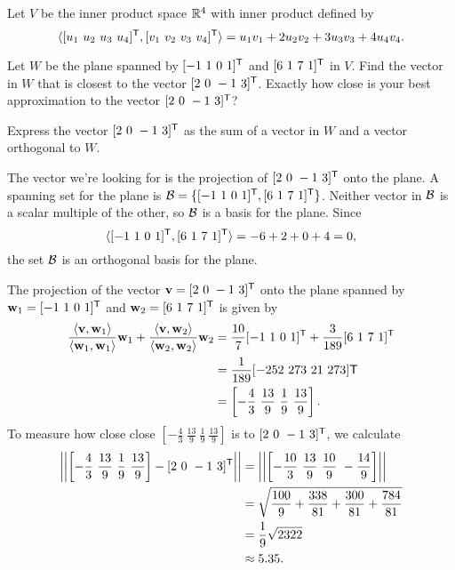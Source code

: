 \begin{example} Let $V$ be the inner product space $\mathbb{R}^4$ with inner product defined by 
\[\langle [u_1 \ u_2 \ u_3 \ u_4]^{\mathsf{T}}, [v_1 \ v_2 \ v_3 \ v_4]^{\mathsf{T}} \rangle = u_1v_1 + 2u_2v_2 + 3u_3v_3 + 4u_4v_4.\]
\ba
\item Let $W$ be the plane spanned by $[-1 \ 1\ 0 \ 1]^{\mathsf{T}}$ and $[6 \ 1 \ 7 \ 1]^{\mathsf{T}}$ in $V$. Find the vector in $W$ that is closest to the vector $[2 \ 0 \ -1 \ 3]^{\mathsf{T}}$. Exactly how close is your best approximation to the vector $[2 \ 0 \ -1 \ 3]^{\mathsf{T}}$?  

\item Express the vector $[2 \ 0 \ -1 \ 3]^{\mathsf{T}}$ as the sum of a vector in $W$ and a vector orthogonal to $W$.

\ea

\ExampleSolution 
\ba
\item The vector we're looking for is the projection of $[2 \ 0 \ -1 \ 3]^{\mathsf{T}}$ onto the plane. A spanning set for the plane is $\mathcal{B} = \{[-1 \ 1 \ 0 \ 1]^{\mathsf{T}}, [6 \ 1 \ 7 \ 1]^{\mathsf{T}}\}$. Neither vector in $\mathcal{B}$ is a scalar multiple of the other, so $\mathcal{B}$ is a basis for the plane. Since
\[\langle [-1 \ 1 \ 0 \ 1]^{\mathsf{T}}, [6 \ 1 \ 7 \ 1]^{\mathsf{T}} \rangle = -6 + 2 + 0 + 4 =  0,\]
the set $\mathcal{B}$ is an orthogonal basis for the plane. 

The projection of the vector $\mathbf{v} = [2 \ 0 \ -1 \ 3]^{\mathsf{T}}$ onto the plane spanned by $\mathbf{w}_1 =  [-1 \ 1 \ 0 \ 1]^{\mathsf{T}}$ and $\mathbf{w}_2 = [6 \ 1 \ 7 \ 1]^{\mathsf{T}}$ is given by 
\begin{align*}
\frac{\langle \mathbf{v}, \mathbf{w}_1\rangle}{\langle \mathbf{w}_1, \mathbf{w}_1\rangle } \mathbf{w}_1 + \frac{\langle \mathbf{v}, \mathbf{w}_2 \rangle }{\langle \mathbf{w}_2, \mathbf{w}_2 \rangle}\mathbf{w}_2 &= \frac{10}{7} [-1 \ 1\ 0 \ 1]^{\mathsf{T}} + \frac{3}{189}  [6 \ 1 \ 7 \ 1]^{\mathsf{T}} \\
	&= \frac{1}{189}[-252 \ 273 \ 21 \ 273]{\mathsf{T}} \\
	&= \left[ -\frac{4}{3} \ \frac{13}{9} \ \frac{1}{9} \ \frac{13}{9} \right].
\end{align*}
To measure how close close $\left[ -\frac{4}{3} \ \frac{13}{9} \ \frac{1}{9} \ \frac{13}{9} \right]$ is to $[2 \ 0 \ -1 \ 3]^{\mathsf{T}}$, we calculate
\begin{align*}
\left|\left| \left[ -\frac{4}{3} \ \frac{13}{9} \ \frac{1}{9} \ \frac{13}{9} \right]   - [2 \ 0 \ -1 \ 3]^{\mathsf{T}} \right|\right| &= \left|\left| \left[-\frac{10}{3} \ \frac{13}{9} \ \frac{10}{9} \ -\frac{14}{9} \right] \right| \right| \\
	&= \sqrt{ \frac{100}{9} + \frac{338}{81} + \frac{300}{81} + \frac{784}{81}} \\
	&= \frac{1}{9} \sqrt{2322} \\
	&\approx 5.35.
\end{align*} 


\end{example}
